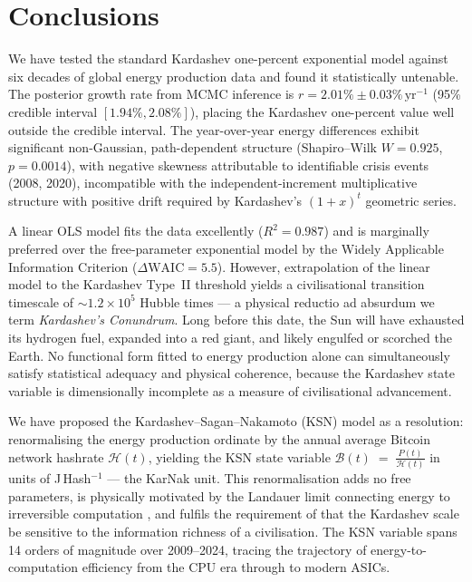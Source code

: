 \documentclass[final,5p,times,twocolumn,authoryear]{elsarticle}
\begin{document}
\section{Conclusions}
\label{sec:conclusions}
 
We have tested the standard Kardashev one-percent exponential
model against six decades of global energy production data
and found it statistically untenable. The posterior growth
rate from MCMC inference is $r = 2.01\% \pm 0.03\%\,
\mathrm{yr}^{-1}$ (95\% credible interval $[1.94\%, 2.08\%]$),
placing the Kardashev one-percent value well outside the
credible interval. The year-over-year energy differences exhibit
significant non-Gaussian, path-dependent structure
(Shapiro--Wilk $W = 0.925$, $p = 0.0014$), with negative
skewness attributable to identifiable crisis events (2008, 2020),
incompatible with the independent-increment
multiplicative structure with positive drift required by Kardashev's 
$(1+x)^t$ geometric series.
 
A linear OLS model fits the data excellently ($R^2 = 0.987$)
and is marginally preferred over the free-parameter exponential
model by the Widely Applicable Information Criterion
($\Delta\mathrm{WAIC} = 5.5$). However, extrapolation of the
linear model to the Kardashev Type~II threshold yields a
civilisational transition timescale of $\sim 1.2 \times 10^5$
Hubble times --- a physical reductio ad absurdum we term
\textit{Kardashev's Conundrum}. Long before this date, the Sun 
will have exhausted its hydrogen fuel, expanded into a red 
giant, and likely engulfed or scorched the Earth. No functional form fitted
to energy production alone can simultaneously satisfy
statistical adequacy and physical coherence, because the
Kardashev state variable is dimensionally incomplete as
a measure of civilisational advancement.
 
We have proposed the Kardashev--Sagan--Nakamoto (KSN)
model as a resolution: renormalising the energy production
ordinate by the annual average Bitcoin network hashrate
$\mathcal{H}(t)$, yielding the KSN state variable $\mathscr{B}(t) \;=\; \frac{P(t)}{\mathcal{H}(t)}$ in
units of J\,Hash$^{-1}$ --- the KarNak unit. This
renormalisation adds no free parameters, is physically
motivated by the Landauer limit connecting energy to
irreversible computation \citep{Landauer1961}, and fulfils
the requirement of \citet{sagan73} that the Kardashev
scale be sensitive to the information richness of a
civilisation. The KSN variable spans 14 orders of magnitude
over 2009--2024, tracing the trajectory of energy-to-computation
efficiency from the CPU era through to modern ASICs.
 
\end{document}

